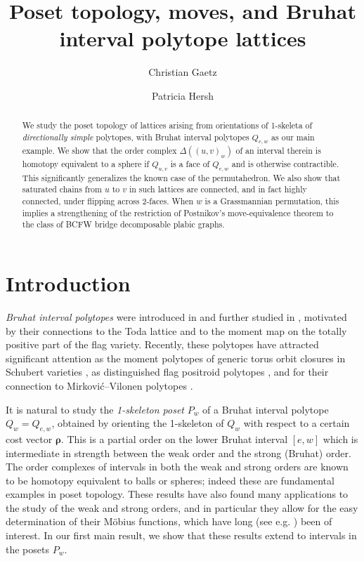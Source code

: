 \documentclass[12pt]{amsart}
\title{Poset topology, moves, and Bruhat interval polytope lattices}
\author{Christian Gaetz}
\author{Patricia Hersh}
\theoremstyle{plain}
\theoremstyle{definition}
\theoremstyle{remark}
\begin{document}
\begin{abstract}
We study the poset topology of lattices arising from orientations of 1-skeleta of \emph{directionally simple} polytopes, with Bruhat interval polytopes $Q_{e,w}$ as our main example. We show that the order complex $\Delta((u,v)_w)$ of an interval therein is homotopy equivalent to a sphere if $Q_{u,v}$ is a face of $Q_{e,w}$ and is otherwise contractible. This significantly generalizes the known case of the permutahedron. We also show that saturated chains from $u$ to $v$ in such lattices are connected, and in fact highly connected, under flipping across 2-faces. When $w$ is a Grassmannian permutation, this implies a strengthening of the restriction of Postnikov's move-equivalence theorem to the class of BCFW bridge decomposable plabic graphs.
\end{abstract}


\maketitle


\section{Introduction}\label{sec:intro}

\emph{Bruhat interval polytopes} were introduced in \cite{KW} and further studied in \cite{TW}, motivated by their connections to the Toda lattice and to the moment map on the totally positive part of the flag variety. Recently, these polytopes have attracted significant attention as the moment polytopes of generic torus orbit closures in Schubert varieties \cite{lee-masuda, lee-masuda-park-song}, as distinguished flag positroid polytopes \cite{boretsky-eur-williams}, and for their connection to Mirkovi\'{c}--Vilonen polytopes \cite{sanchez}.

It is natural to study the \emph{1-skeleton poset} $P_w$ of a Bruhat interval polytope $Q_w=Q_{e,w}$, obtained by orienting the 1-skeleton of $Q_w$ with respect to a certain cost vector $\boldsymbol{\rho}$. This is a partial order on the lower Bruhat interval $[e,w]$ which is intermediate in strength between the weak order and the strong (Bruhat) order. The order complexes of intervals in both the weak and strong orders are known \cite{bjorner-bruhat, bj, BW-bruhat-order} to be homotopy equivalent to balls or spheres; indeed these are fundamental examples in poset topology. These results have also found many applications to the study of the weak and strong orders, and in particular they allow for the easy determination of their M\"{o}bius functions, which have long (see e.g. \cite{verma}) been of interest. In our first main result, we show that these results extend to intervals in the posets $P_w$. 
\end{document}

